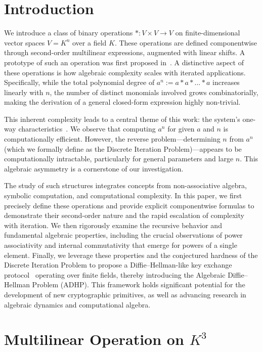\documentclass[12pt]{article}
\theoremstyle{definition}
\theoremstyle{plain}
\theoremstyle{remark}
\begin{document}
\section*{Introduction}

We introduce a class of binary operations \( * : V \times V \to V \) on finite-dimensional vector spaces \( V = K^n \) over a field \( K \). These operations are defined componentwise through second-order multilinear expressions, augmented with linear shifts. A prototype of such an operation was first proposed in~\cite{semenov2025stratified}. A distinctive aspect of these operations is how algebraic complexity scales with iterated applications. Specifically, while the total polynomial degree of \( a^n := a * a * \dots * a \) increases linearly with \( n \), the number of distinct monomials involved grows combinatorially, making the derivation of a general closed-form expression highly non-trivial.

This inherent complexity leads to a central theme of this work: the system's one-way characteristics~\cite{Goldreich2001}. We observe that computing \( a^n \) for given \( a \) and \( n \) is computationally efficient. However, the reverse problem—determining \( n \) from \( a^n \) (which we formally define as the Discrete Iteration Problem)—appears to be computationally intractable, particularly for general parameters and large \( n \). This algebraic asymmetry is a cornerstone of our investigation.

The study of such structures integrates concepts from non-associative algebra, symbolic computation, and computational complexity. In this paper, we first precisely define these operations and provide explicit componentwise formulas to demonstrate their second-order nature and the rapid escalation of complexity with iteration. We then rigorously examine the recursive behavior and fundamental algebraic properties, including the crucial observations of power associativity and internal commutativity that emerge for powers of a single element. Finally, we leverage these properties and the conjectured hardness of the Discrete Iteration Problem to propose a Diffie–Hellman-like key exchange protocol~\cite{Diffie1976} operating over finite fields, thereby introducing the Algebraic Diffie–Hellman Problem (ADHP). This framework holds significant potential for the development of new cryptographic primitives, as well as advancing research in algebraic dynamics and computational algebra.

\section{Multilinear Operation on \texorpdfstring{$K^3$}{K³}}
\end{document}
